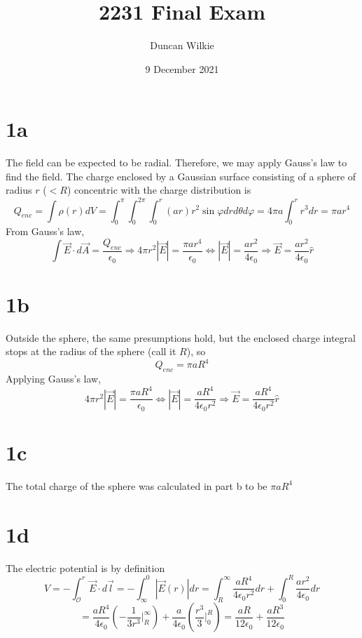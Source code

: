 \documentclass{article}
\title{2231 Final Exam}
\author{Duncan Wilkie}
\date{9 December 2021}
\begin{document}
\maketitle

\section*{1a}
The field can be expected to be radial. Therefore, we may apply Gauss's law to find the field. The charge enclosed by a Gaussian surface consisting of a sphere of radius $r$ ($<R$) concentric with the charge distribution is
\[Q_{enc}=\int\rho(r)dV=\int_0^\pi\int_0^{2\pi}\int_0^r(ar)r^2\sin\varphi drd\theta d\varphi=4\pi a\int_0^rr^3dr=\pi ar^4\]
From Gauss's law,
\[\int\vec{E}\cdot d\vec{A}=\frac{Q_{enc}}{\epsilon_0}\Rightarrow 4\pi r^2|\vec{E}|=\frac{\pi ar^4}{\epsilon_0} \Leftrightarrow |\vec{E}|=\frac{ar^2}{4\epsilon_0} \Rightarrow \vec{E}=\frac{ar^2}{4\epsilon_0}\hat{r}\]

\section*{1b}
Outside the sphere, the same presumptions hold, but the enclosed charge integral stops at the radius of the sphere (call it $R$), so \[Q_{enc}=\pi aR^4\]
Applying Gauss's law,
\[4\pi r^2|\vec{E}|=\frac{\pi aR^4}{\epsilon_0} \Leftrightarrow |\vec{E}|=\frac{a R^4}{4\epsilon_0 r^2}\Rightarrow \vec{E}=\frac{aR^4}{4\epsilon_0 r^2}\hat{r}\]

\section*{1c}
The total charge of the sphere was calculated in part b to be $\pi aR^4$

\section*{1d}
The electric potential is by definition
\[V=-\int_{\mathcal{O}}^r\vec{E}\cdot d\vec{l}=-\int_{\infty}^0|\vec{E}(r)|dr=\int_{R}^\infty\frac{aR^4}{4\epsilon_0 r^2}dr+\int_0^R\frac{ar^2}{4\epsilon_0}dr\]
\[=\frac{aR^4}{4\epsilon_0}\left( -\frac{1}{3r^3}\bigg|_{R}^\infty \right)+\frac{a}{4\epsilon_0}\left( \frac{r^3}{3}\bigg|_0^R \right)=\frac{aR}{12\epsilon_0}+\frac{aR^3}{12\epsilon_0}\]
\end{document}
